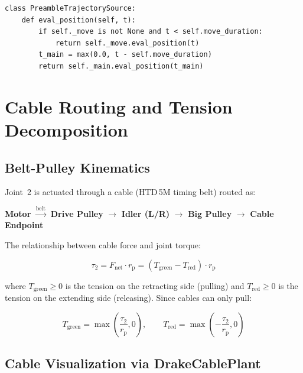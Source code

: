 \documentclass[11pt,a4paper]{article}
\newcommand{\rp}{r_{\mathrm{p}}}
\begin{document}
\begin{lstlisting}[caption={Preamble source switches between move and main --- \texttt{rl/trajectory.py}}]
class PreambleTrajectorySource:
    def eval_position(self, t):
        if self._move is not None and t < self.move_duration:
            return self._move.eval_position(t)
        t_main = max(0.0, t - self.move_duration)
        return self._main.eval_position(t_main)
\end{lstlisting}


\section{Cable Routing and Tension Decomposition}
\label{sec:cables}

\subsection{Belt-Pulley Kinematics}

Joint~2 is actuated through a cable (HTD\,5M timing belt) routed as:

\begin{center}
\textbf{Motor} $\xrightarrow{\text{belt}}$ \textbf{Drive Pulley} $\to$ \textbf{Idler (L/R)} $\to$ \textbf{Big Pulley} $\to$ \textbf{Cable Endpoint}
\end{center}

The relationship between cable force and joint torque:

\begin{equation}
    \tau_2 = F_{\mathrm{net}} \cdot \rp = (T_{\mathrm{green}} - T_{\mathrm{red}}) \cdot \rp
\end{equation}

where $T_{\mathrm{green}} \geq 0$ is the tension on the retracting side (pulling) and $T_{\mathrm{red}} \geq 0$ is the tension on the extending side (releasing). Since cables can only pull:

\begin{equation}
    T_{\mathrm{green}} = \max\!\left(\frac{\tau_2}{\rp}, 0\right), \qquad
    T_{\mathrm{red}} = \max\!\left(-\frac{\tau_2}{\rp}, 0\right)
    \label{eq:tension_decomp}
\end{equation}

\subsection{Cable Visualization via DrakeCablePlant}
\end{document}
